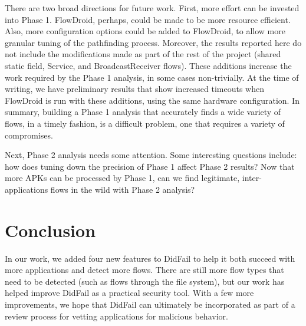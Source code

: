 There are two broad directions for future work.  First, more effort can be invested into Phase 1.  FlowDroid, perhaps, could be made to be more resource efficient.  Also, more configuration options could be added to FlowDroid, to allow more granular tuning of the pathfinding process.  Moreover, the results reported here do not include the modifications made as part of the rest of the project (shared static field, Service, and BroadcastReceiver flows).  These additions increase the work required by the Phase 1 analysis, in some cases non-trivially.  At the time of writing, we have preliminary results that show increased timeouts when FlowDroid is run with these additions, using the same hardware configuration.  In summary, building a Phase 1 analysis that accurately finds a wide variety of flows, in a timely fashion, is a difficult problem, one that requires a variety of compromises. 

Next, Phase 2 analysis needs some attention.  Some interesting questions include: how does tuning down the precision of Phase 1 affect Phase 2 results?  Now that more APKs can be processed by Phase 1, can we find legitimate, inter-applications flows in the wild with Phase 2 analysis?

\section{Conclusion}

In our work, we added four new features to DidFail to help it both succeed with more applications and detect more flows. There are still more flow types that need to be detected (such as flows through the file system), but our work has helped improve DidFail as a practical security tool. With a few more improvements, we hope that DidFail can ultimately be incorporated as part of a review process for vetting applications for malicious behavior.







